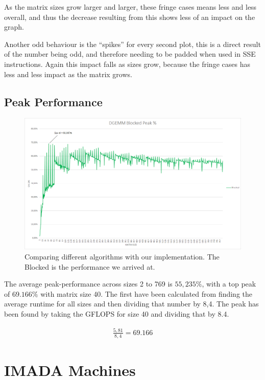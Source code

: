 \documentclass[a4paper,11pt,oneside]{book}
\begin{document}
As the matrix sizes grow larger and larger, these fringe cases means less and less overall, and thus the decrease resulting from this shows less of an impact on the graph.

Another odd behaviour is the ``spikes'' for every second plot, this is a direct result of the number being odd, and therefore needing to be padded when used in SSE instructions. Again this impact falls as sizes grow, because the fringe cases has less and less impact as the matrix grows.

\subsection{Peak Performance}

\begin{figure}[H]
  \centering
  \includegraphics[width=0.9\linewidth]{peak-graph.png}
  \caption{Comparing different algorithms with our implementation. The Blocked is the performance we arrived at.}
  \centering
  \label{fig:sub1}
\end{figure}

The average peak-performance across sizes 2 to 769 is $55,235\%$, with a top peak of $69.166\%$ with matrix size 40. The first have been calculated from finding the average runtime for all sizes and then dividing that number by 8,4. The peak has been found by taking the GFLOPS for size 40 and dividing that by 8.4.

\begin{align*}
\frac{5,81}{8,4} = 69.166%
\end{align*}

\section{IMADA Machines}
\end{document}
